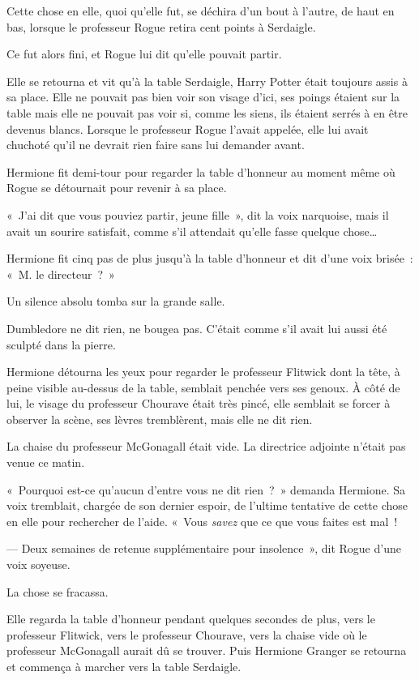 Cette chose en elle, quoi qu'elle fut, se déchira d'un bout à l'autre, de haut en bas, lorsque le professeur Rogue retira cent points à Serdaigle.

Ce fut alors fini, et Rogue lui dit qu'elle pouvait partir.

Elle se retourna et vit qu'à la table Serdaigle, Harry Potter était toujours assis à sa place. Elle ne pouvait pas bien voir son visage d'ici, ses poings étaient sur la table mais elle ne pouvait pas voir si, comme les siens, ils étaient serrés à en être devenus blancs. Lorsque le professeur Rogue l'avait appelée, elle lui avait chuchoté qu'il ne devrait rien faire sans lui demander avant.

Hermione fit demi-tour pour regarder la table d'honneur au moment même où Rogue se détournait pour revenir à sa place.

«~J'ai dit que vous pouviez partir, jeune fille~», dit la voix narquoise, mais il avait un sourire satisfait, comme s'il attendait qu'elle fasse quelque chose…

Hermione fit cinq pas de plus jusqu'à la table d'honneur et dit d'une voix brisée~: «~M. le directeur~?~»

Un silence absolu tomba sur la grande salle.

Dumbledore ne dit rien, ne bougea pas. C'était comme s'il avait lui aussi été sculpté dans la pierre.

Hermione détourna les yeux pour regarder le professeur Flitwick dont la tête, à peine visible au-dessus de la table, semblait penchée vers ses genoux. À côté de lui, le visage du professeur Chourave était très pincé, elle semblait se forcer à observer la scène, ses lèvres tremblèrent, mais elle ne dit rien.

La chaise du professeur McGonagall était vide. La directrice adjointe n'était pas venue ce matin.

«~Pourquoi est-ce qu'aucun d'entre vous ne dit rien~?~» demanda Hermione. Sa voix tremblait, chargée de son dernier espoir, de l'ultime tentative de cette chose en elle pour rechercher de l'aide. «~Vous \emph{savez} que ce que vous faites est mal~!

--- Deux semaines de retenue supplémentaire pour insolence~», dit Rogue d'une voix soyeuse.

La chose se fracassa.

Elle regarda la table d'honneur pendant quelques secondes de plus, vers le professeur Flitwick, vers le professeur Chourave, vers la chaise vide où le professeur McGonagall aurait dû se trouver. Puis Hermione Granger se retourna et commença à marcher vers la table Serdaigle.

